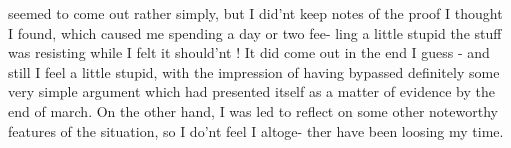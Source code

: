 seemed to come out rather simply,  but I did'nt keep notes of the
proof I thought I found,  which caused me spending a day or two fee-%
ling a little stupid\hand{,}  the stuff was resisting while I felt it
should'nt !  It did come out in the end I guess -  and still I feel a
little stupid, with the impression of having bypassed definitely some
very simple argument which had presented itself as a matter of evidence
by the end of march.  On the other hand,  I was led to reflect on some
other noteworthy features of the situation,  so I do'nt feel I altoge-%
ther have been loosing my time.

